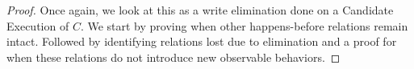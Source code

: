\begin{proof}
    Once again, we look at this as a write elimination done on a Candidate Execution of $C$. We start by proving when other happens-before relations remain intact. Followed by identifying relations lost due to elimination and a proof for when these relations do not introduce new observable behaviors. 
    
   
   
   
   

\end{proof}